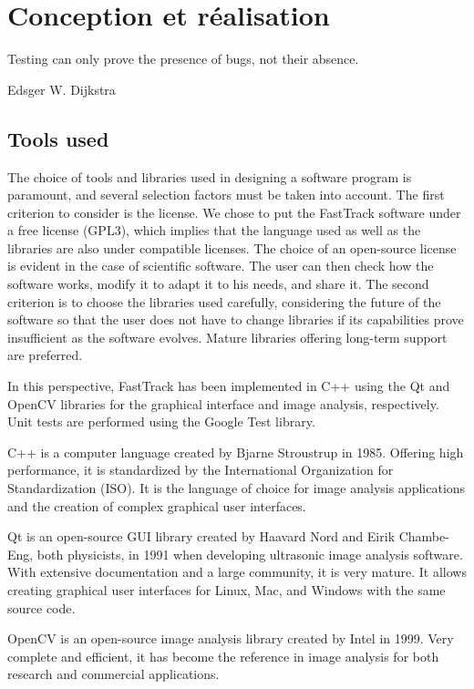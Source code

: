 \chapter{Conception et réalisation}

    \epigraph{Testing can only prove the presence of bugs, not their absence.}{Edsger W. Dijkstra}

	\section{Tools used}
	
	The choice of tools and libraries used in designing a software program is paramount, and several selection factors must be taken into account.
	The first criterion to consider is the license. We chose to put the FastTrack software under a free license (GPL3), which implies that the language used as well as the libraries are also under compatible licenses. The choice of an open-source license is evident in the case of scientific software. The user can then check how the software works, modify it to adapt it to his needs, and share it.
	The second criterion is to choose the libraries used carefully, considering the future of the software so that the user does not have to change libraries if its capabilities prove insufficient as the software evolves. Mature libraries offering long-term support are preferred.

	In this perspective, FastTrack has been implemented in C++ using the Qt \cite{Qt} and OpenCV \cite{opencv_library} libraries for the graphical interface and image analysis, respectively. Unit tests are performed using the Google Test library.

	C++ is a computer language created by Bjarne Stroustrup in 1985. Offering high performance, it is standardized by the International Organization for Standardization (ISO). It is the language of choice for image analysis applications and the creation of complex graphical user interfaces.

	Qt is an open-source GUI library created by Haavard Nord and Eirik Chambe-Eng, both physicists, in 1991 when developing ultrasonic image analysis software. With extensive documentation and a large community, it is very mature. It allows creating graphical user interfaces for Linux, Mac, and Windows with the same source code.

	OpenCV is an open-source image analysis library created by Intel in 1999. Very complete and efficient, it has become the reference in image analysis for both research and commercial applications.


